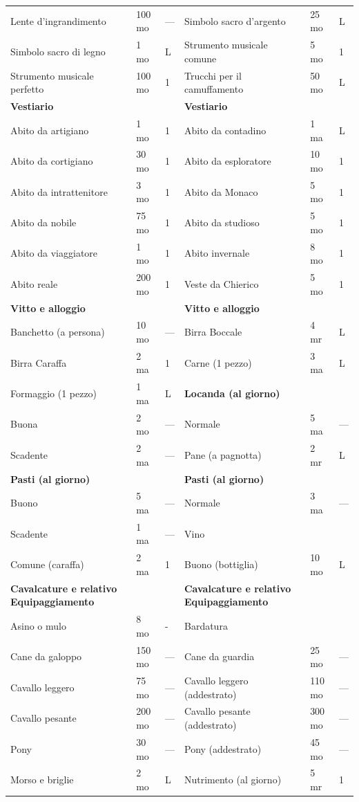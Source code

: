 \documentclass[a4paper,11pt,twoside,openany]{book}
\begin{document}
{\begin{longtable}{|L{4cm} |k{1.5cm} |k{1.5cm}|L{5cm} |k{1.5cm} |k{1.5cm}|}
			Lente d’ingrandimento&100 mo&—&	Simbolo sacro d’argento&25 mo&L\\
			Simbolo sacro di legno&1 mo&L&	Strumento musicale comune&5 mo&1\\
			Strumento musicale perfetto&100 mo&1&	Trucchi per il camuffamento&50 mo&L\\
			\textbf{Vestiario}&&&\textbf{Vestiario}&&\\
			Abito da artigiano&1 mo&1&	Abito da contadino&1 ma&L\\
			Abito da cortigiano&30 mo&1&	Abito da esploratore&10 mo&1\\
			Abito da intrattenitore&3 mo&1&	Abito da Monaco&5 mo&1\\
			Abito da nobile&75 mo&1&	Abito da studioso&5 mo&1\\
			Abito da viaggiatore&1 mo&1&	Abito invernale&8 mo&1\\
			Abito reale&200 mo&1&	Veste da Chierico&5 mo&1\\
			\textbf{Vitto e alloggio}&&&	\textbf{Vitto e alloggio}&&\\
			Banchetto (a persona)&10 mo&—&	Birra Boccale&4 mr&L\\
			Birra Caraffa&2 ma&1&	Carne (1 pezzo)&3 ma&L\\
			Formaggio (1 pezzo)&1 ma&L&\textbf{Locanda (al giorno)}&&\\
			Buona&2 mo&—&	Normale&5 ma&—\\
			Scadente&2 ma&—&	Pane (a pagnotta)&2 mr&L\\
			\textbf{Pasti (al giorno)}&&&\textbf{Pasti (al giorno)}&&\\
			Buono&5 ma&—&	Normale&3 ma&—\\
			Scadente&1 ma&—&	Vino&&\\
			Comune (caraffa)&2 ma&1&	Buono (bottiglia)&10 mo&L\\
			\textbf{Cavalcature e relativo Equipaggiamento}&&&\textbf{Cavalcature e relativo Equipaggiamento}&&\\
			Asino o mulo&8 mo&-&	Bardatura&&\\
			Cane da galoppo&150 mo&—&	Cane da guardia&25 mo&—\\
			Cavallo leggero&75 mo&—&	Cavallo leggero (addestrato)&110 mo&—\\
			Cavallo pesante&200 mo&—&	Cavallo pesante (addestrato)&300 mo&—\\
			Pony&30 mo&—&	Pony (addestrato)&45 mo&—\\
			Morso e briglie&2 mo&L&	Nutrimento (al giorno)&5 mr&1\\

\end{longtable}}
\end{document}
